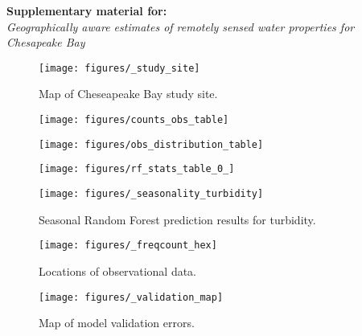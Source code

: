 \documentclass[12pt]{article}
\begin{document}
\begin{center}
\textbf{Supplementary material for:}\\
\emph{Geographically aware estimates of remotely sensed water properties for Chesapeake Bay}
\end{center}

\begin{figure}[h!]
    \begin{center}
          \texttt{[image: figures/\_study\_site]}
          \caption{Map of Cheseapeake Bay study site.}
    \end{center}    
\end{figure}

\begin{figure}[h!]
    \begin{center}
          \texttt{[image: figures/counts\_obs\_table]}
    \end{center}    
\end{figure}

\begin{figure}[h!]
    \begin{center}
          \texttt{[image: figures/obs\_distribution\_table]}
    \end{center}    
\end{figure}

\begin{figure}[h!]
    \begin{center}
          \texttt{[image: figures/rf\_stats\_table\_0\_]}
    \end{center}    
\end{figure}

\begin{figure}[h!]
    \begin{center}
          \texttt{[image: figures/\_seasonality\_turbidity]}
          \caption{Seasonal Random Forest prediction results for turbidity.}
    \end{center}    
\end{figure}

\begin{figure}[h!]
    \begin{center}
          \texttt{[image: figures/\_freqcount\_hex]}
          \caption{Locations of observational data.}
    \end{center}    
\end{figure}

\begin{figure}[h!]
    \begin{center}
          \texttt{[image: figures/\_validation\_map]}
          \caption{Map of model validation errors.}
    \end{center}    
\end{figure}

\clearpage
\end{document}
